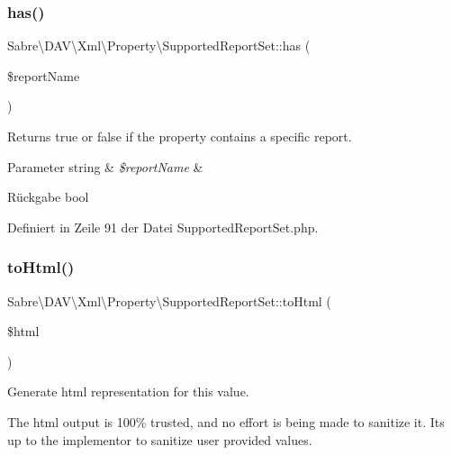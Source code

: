 \subsubsection{\texorpdfstring{has()}{has()}}
{\footnotesize\ttfamily Sabre\textbackslash{}\+D\+A\+V\textbackslash{}\+Xml\textbackslash{}\+Property\textbackslash{}\+Supported\+Report\+Set\+::has (\begin{DoxyParamCaption}\item[{}]{\$report\+Name }\end{DoxyParamCaption})}

Returns true or false if the property contains a specific report.


\begin{DoxyParams}[1]{Parameter}
string & {\em \$report\+Name} & \\
\hline
\end{DoxyParams}
\begin{DoxyReturn}{Rückgabe}
bool 
\end{DoxyReturn}


Definiert in Zeile 91 der Datei Supported\+Report\+Set.\+php.

\mbox{\label{class_sabre_1_1_d_a_v_1_1_xml_1_1_property_1_1_supported_report_set_a3775a63feb6a3353e4f00bea05f66fad}} 
\subsubsection{\texorpdfstring{to\+Html()}{toHtml()}}
{\footnotesize\ttfamily Sabre\textbackslash{}\+D\+A\+V\textbackslash{}\+Xml\textbackslash{}\+Property\textbackslash{}\+Supported\+Report\+Set\+::to\+Html (\begin{DoxyParamCaption}\item[{\mbox{\hyperlink{class_sabre_1_1_d_a_v_1_1_browser_1_1_html_output_helper}{Html\+Output\+Helper}}}]{\$html }\end{DoxyParamCaption})}

Generate html representation for this value.

The html output is 100\% trusted, and no effort is being made to sanitize it. It\textquotesingle{}s up to the implementor to sanitize user provided values.

